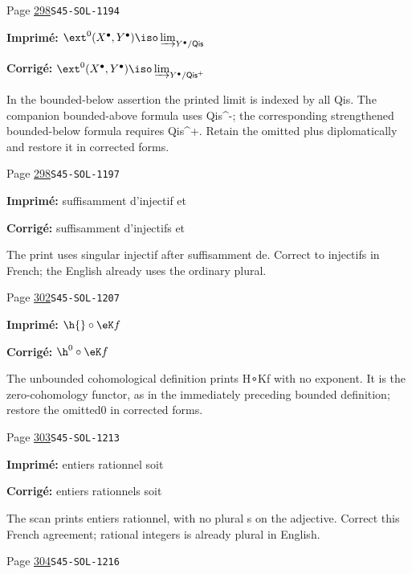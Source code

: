 \begin{description}
\smallskip
\item[\hypertarget{apparatus:FR-0299}{299}] Page \hyperlink{printpage:fr:298}{298}\quad\texttt{S45-SOL-1194}
\par\noindent\textbf{Imprimé:} \(\ext^0(X^\bullet,Y^\bullet) \iso \varinjlim_{Y^\bullet/\mathsf{Qis}}\)
\par\noindent\textbf{Corrigé:} \(\ext^0(X^\bullet,Y^\bullet) \iso \varinjlim_{Y^\bullet/\mathsf{Qis}^+}\)
\par\noindent In the bounded-below assertion the printed limit is indexed by all Qis. The companion bounded-above formula uses Qis\textasciicircum{}-; the corresponding strengthened bounded-below formula requires Qis\textasciicircum{}+. Retain the omitted plus diplomatically and restore it in corrected forms.
\smallskip
\item[\hypertarget{apparatus:FR-0300}{300}] Page \hyperlink{printpage:fr:298}{298}\quad\texttt{S45-SOL-1197}
\par\noindent\textbf{Imprimé:} suffisamment d'injectif et
\par\noindent\textbf{Corrigé:} suffisamment d'injectifs et
\par\noindent The print uses singular injectif after suffisamment de. Correct to injectifs in French; the English already uses the ordinary plural.
\smallskip
\item[\hypertarget{apparatus:FR-0301}{301}] Page \hyperlink{printpage:fr:302}{302}\quad\texttt{S45-SOL-1207}
\par\noindent\textbf{Imprimé:} \(\h{}\circ \eK f\)
\par\noindent\textbf{Corrigé:} \(\h^0{}\circ \eK f\)
\par\noindent The unbounded cohomological definition prints H∘Kf with no exponent. It is the zero-cohomology functor, as in the immediately preceding bounded definition; restore the omitted0 in corrected forms.
\smallskip
\item[\hypertarget{apparatus:FR-0302}{302}] Page \hyperlink{printpage:fr:303}{303}\quad\texttt{S45-SOL-1213}
\par\noindent\textbf{Imprimé:} entiers rationnel soit
\par\noindent\textbf{Corrigé:} entiers rationnels soit
\par\noindent The scan prints entiers rationnel, with no plural s on the adjective. Correct this French agreement; rational integers is already plural in English.
\smallskip
\item[\hypertarget{apparatus:FR-0303}{303}] Page \hyperlink{printpage:fr:304}{304}\quad\texttt{S45-SOL-1216}

\end{description}
